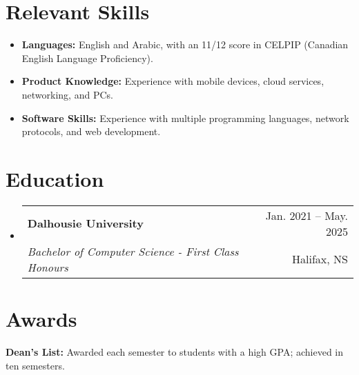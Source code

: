 \documentclass[letterpaper,11pt]{article}
\makeatletter
\newcommand{\resumeItem}[1]{
  \item\small{
    {#1 \vspace{-2pt}}
  }
}
\newcommand{\resumeSubheading}[4]{
  \vspace{-2pt}\item
    \begin{tabular*}{0.97\textwidth}[t]{l@{\extracolsep{\fill}}r}
      \textbf{#1} & #2 \\
			\textit{\small#3} & \small #4 \\
    \end{tabular*}\vspace{-7pt}
}
\newcommand{\resumeSubHeadingListStart}{\begin{itemize}[leftmargin=0.15in, label={}]}
\newcommand{\resumeSubHeadingListEnd}{\end{itemize}}
\newcommand{\resumeItemListStart}{\begin{itemize}}
\newcommand{\resumeItemListEnd}{\end{itemize}\vspace{-5pt}}
\makeatother
\begin{document}

\vspace{5pt}
\section{Relevant Skills}
  \resumeItemListStart
		\resumeItem{\textbf{Languages:} English and Arabic, with an 11/12 score in CELPIP (Canadian English Language Proficiency).}
		\resumeItem{\textbf{Product Knowledge: }{Experience with mobile devices, cloud services, networking, and PCs.}} \\
		\resumeItem{\textbf{Software Skills: } Experience with multiple programming languages, network protocols, and web development.}
	\resumeItemListEnd 



\vspace{5pt}
\section{Education}
  \resumeSubHeadingListStart
    \resumeSubheading
      {Dalhousie University}{Jan. 2021 -- May. 2025}
      {Bachelor of Computer Science - First Class Honours}
      {Halifax, NS}
    
  \resumeSubHeadingListEnd


\section{Awards}
 \begin{itemize}[leftmargin=0.15in, label={}]
    \small{\item{
   
     \textbf{Dean's List:}{ Awarded each semester to students with a high GPA; achieved in ten semesters.}
    
    }}
 \end{itemize}


\end{document}
